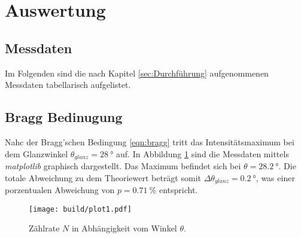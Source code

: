 \section{Auswertung}
\label{sec:Auswertung}
\subsection{Messdaten}
Im Folgenden sind die nach Kapitel \ref{sec:Durchführung} aufgenommenen Messdaten tabellarisch aufgelistet. 



\subsection{Bragg Bedinugung}
\label{sec:brag}
Nahc der Bragg'schen Bedingung \eqref{eqn:bragg} tritt das Intensitätsmaximum bei dem Glanzwinkel $\theta_{glanz}=\SI{28}{\degree}$ auf. 
In Abbildung \ref{fig:plot1} sind die Messdaten mittels \textit{matplotlib} \cite{matplotlib} graphisch dargestellt. Das Maximum befindet 
sich bei $\theta=\SI{28.2}{\degree}$. Die totale Abweichung zu dem Theoriewert beträgt somit $\Delta\theta_{glanz}=\SI{0.2}{\degree}$,
was einer porzentualen Abweichung von $p=\SI{0.71}{\percent}$ entspricht.
\begin{figure}[H]
    \centering
    \texttt{[image: build/plot1.pdf]}
    \caption{Zählrate $N$ in Abhängigkeit vom Winkel $\theta$.}
    \label{fig:plot1}
\end{figure}


